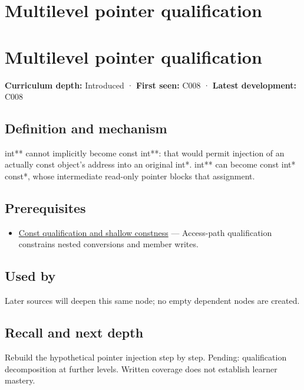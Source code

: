 \hypertarget{appendix-5e1a7561cd98}{}
\section*{Multilevel pointer qualification}
\section{Multilevel pointer qualification}\label{multilevel-pointer-qualification}

\textbf{Curriculum depth:} Introduced · \textbf{First seen:} C008 · \textbf{Latest development:} C008

\subsection{Definition and mechanism}\label{definition-and-mechanism}

int** cannot implicitly become const int**: that would permit injection of an actually const object's address into an original int*. int** can become const int* const*, whose intermediate read-only pointer blocks that assignment.

\subsection{Prerequisites}\label{prerequisites}

\begin{itemize}
\tightlist
\item
  \hyperref[appendix-c25d60fed375]{Const qualification and shallow constness} --- Access-path qualification constrains nested conversions and member writes.
\end{itemize}

\subsection{Used by}\label{used-by}

Later sources will deepen this same node; no empty dependent nodes are created.

\subsection{Recall and next depth}\label{recall-and-next-depth}

Rebuild the hypothetical pointer injection step by step. Pending: qualification decomposition at further levels. Written coverage does not establish learner mastery.

